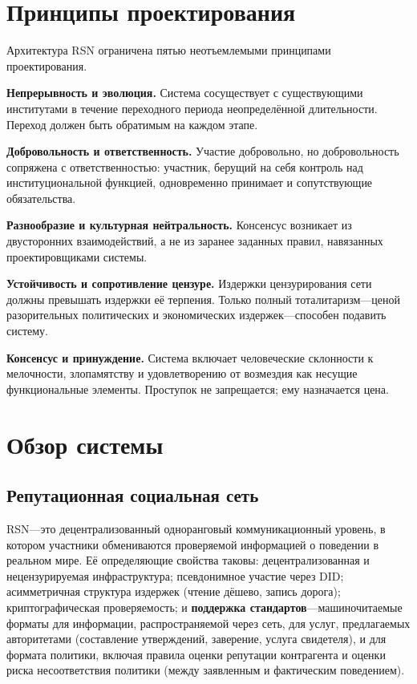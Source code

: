 \documentclass[11pt,a4paper,twocolumn]{article}
\begin{document}
\section{Принципы проектирования}

Архитектура RSN ограничена пятью неотъемлемыми принципами проектирования.

\textbf{Непрерывность и эволюция.} Система сосуществует с существующими институтами в течение переходного периода неопределённой длительности. Переход должен быть обратимым на каждом этапе.

\textbf{Добровольность и ответственность.} Участие добровольно, но добровольность сопряжена с ответственностью: участник, берущий на себя контроль над институциональной функцией, одновременно принимает и сопутствующие обязательства.

\textbf{Разнообразие и культурная нейтральность.} Консенсус возникает из двусторонних взаимодействий, а не из заранее заданных правил, навязанных проектировщиками системы.

\textbf{Устойчивость и сопротивление цензуре.} Издержки цензурирования сети должны превышать издержки её терпения. Только полный тоталитаризм---ценой разорительных политических и экономических издержек---способен подавить систему.

\textbf{Консенсус и принуждение.} Система включает человеческие склонности к мелочности, злопамятству и удовлетворению от возмездия как несущие функциональные элементы. Проступок не запрещается; ему назначается цена.

\section{Обзор системы}

\subsection{Репутационная социальная сеть}

RSN---это децентрализованный одноранговый коммуникационный уровень, в котором участники обмениваются проверяемой информацией о поведении в реальном мире. Её определяющие свойства таковы: децентрализованная и нецензурируемая инфраструктура; псевдонимное участие через DID; асимметричная структура издержек (чтение дёшево, запись дорога); криптографическая проверяемость; и \textbf{поддержка стандартов}---машиночитаемые форматы для информации, распространяемой через сеть, для услуг, предлагаемых авторитетами (составление утверждений, заверение, услуга свидетеля), и для формата политики, включая правила оценки репутации контрагента и оценки риска несоответствия политики (между заявленным и фактическим поведением).
\end{document}
